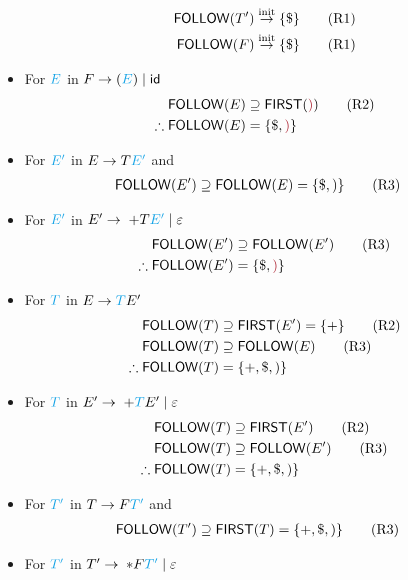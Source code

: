 \documentclass[10pt,a4paper,landscape]{article}
\begin{document}
\begin{multicols*}{3}
\begin{itemize}
\begin{align*}
    \mathsf{FOLLOW}(T') &\overset{\text{init}}{\to} \{\$\} \tag{R1} \\
    \mathsf{FOLLOW}(F) &\overset{\text{init}}{\to}  \{\$\} \tag{R1} \\
  \end{align*}
\item For $\mb{E}$ in $F\to (\mb{E})\gor \mathsf{id}$
  \begin{align*}
    \mathsf{FOLLOW}(E) &\supseteq \mathsf{FIRST}(\mathtt{\mo{)}}) \tag{R2} \\
    \therefore \mathsf{FOLLOW}(E) &=\mset{\$, \mo{)}}
  \end{align*}
\item For $\mb{E'}$ in $E\to T\mb{E'}$ and
  \begin{align*}
    \mathsf{FOLLOW}(E') &\supseteq \mathsf{FOLLOW}(E) = \{\$,)\} \tag{R3}
  \end{align*}
\item For $\mb{E'}$ in $E'\to\; + T\mb{E'} \gor \varepsilon$
  \begin{align*}
    \mathsf{FOLLOW}(E') &\supseteq \mathsf{FOLLOW}(E') \tag{R3} \\
    \therefore \mathsf{FOLLOW}(E') &= \mset{\$, \mo{)} }
  \end{align*}
\item For $\mb{T}$ in $E\to \mb{T}E'$
    \begin{align*}
      \mathsf{FOLLOW}(T) &\supseteq \mathsf{FIRST}(E') = \{+\} \tag{R2} \\
      \mathsf{FOLLOW}(T) &\supseteq \mathsf{FOLLOW}(E) \tag{R3} \\
      \therefore \mathsf{FOLLOW}(T) &= \{+,\$,)\}
    \end{align*}
\item For $\mb{T}$ in $E'\to\; +\mb{T}E' \gor \varepsilon$
  \begin{align*}
    \mathsf{FOLLOW}(T) &\supseteq \mathsf{FIRST}(E') \tag{R2} \\
    \mathsf{FOLLOW}(T) &\supseteq \mathsf{FOLLOW}(E') \tag{R3} \\
    \therefore \mathsf{FOLLOW}(T) &= \{+,\$,)\}
  \end{align*}
\item For $\mb{T'}$ in $T\to F\mb{T'}$ and
  \begin{align*}
    \mathsf{FOLLOW}(T') &\supseteq \mathsf{FIRST}(T) = \{+, \$, )\} \tag{R3}
  \end{align*}
\item For $\mb{T'}$ in $T'\to\; *F\mb{T'} \gor \varepsilon$

\end{itemize}
\end{multicols*}
\end{document}
